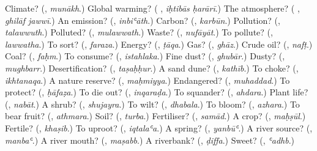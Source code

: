 \begin{tcolorbox}[breakable,colback=teal!4,colframe=teal!35!black,title={Before you move on}]
Climate? (\textbf{}, \emph{munākh}.) Global warming? (\textbf{ }, \emph{iḥtibās ḥarārī}.) The atmosphere? (\textbf{ }, \emph{ghilāf jawwī}.) An emission? (\textbf{}, \emph{inbiʿāth}.) Carbon? (\textbf{}, \emph{karbūn}.) Pollution? (\textbf{}, \emph{talawwuth}.) Polluted? (\textbf{}, \emph{mulawwath}.) Waste? (\textbf{}, \emph{nufāyāt}.) To pollute? (\textbf{}, \emph{lawwatha}.) To sort? (\textbf{}, \emph{faraza}.) Energy? (\textbf{}, \emph{ṭāqa}.) Gas? (\textbf{}, \emph{ghāz}.) Crude oil? (\textbf{}, \emph{nafṭ}.) Coal? (\textbf{}, \emph{faḥm}.) To consume? (\textbf{}, \emph{istahlaka}.) Fine dust? (\textbf{}, \emph{ghubār}.) Dusty? (\textbf{}, \emph{mughbarr}.) Desertification? (\textbf{}, \emph{taṣaḥḥur}.) A sand dune? (\textbf{}, \emph{kathīb}.) To choke? (\textbf{}, \emph{ikhtanaqa}.) A nature reserve? (\textbf{}, \emph{maḥmiyya}.) Endangered? (\textbf{}, \emph{muhaddad}.) To protect? (\textbf{}, \emph{ḥāfaẓa}.) To die out? (\textbf{}, \emph{inqaraḍa}.) To squander? (\textbf{}, \emph{ahdara}.) Plant life? (\textbf{}, \emph{nabāt}.) A shrub? (\textbf{}, \emph{shujayra}.) To wilt? (\textbf{}, \emph{dhabala}.) To bloom? (\textbf{}, \emph{azhara}.) To bear fruit? (\textbf{}, \emph{athmara}.) Soil? (\textbf{}, \emph{turba}.) Fertiliser? (\textbf{}, \emph{samād}.) A crop? (\textbf{}, \emph{maḥṣūl}.) Fertile? (\textbf{}, \emph{khaṣib}.) To uproot? (\textbf{}, \emph{iqtalaʿa}.) A spring? (\textbf{}, \emph{yanbūʿ}.) A river source? (\textbf{}, \emph{manbaʿ}.) A river mouth? (\textbf{}, \emph{maṣabb}.) A riverbank? (\textbf{}, \emph{ḍiffa}.) Sweet? (\textbf{}, \emph{ʿadhb}.)
\end{tcolorbox}
